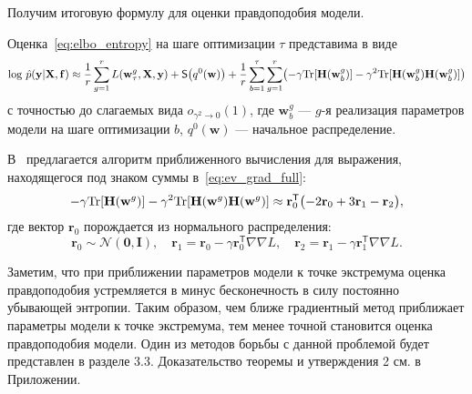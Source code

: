 \documentclass[12pt]{a&t}
\begin{document}
Получим итоговую формулу для оценки правдоподобия модели.
\begin{statement}\label{st:st2}
Оценка~\eqref{eq:elbo_entropy} на шаге оптимизации $\tau$ представима в виде
\begin{equation}
\label{eq:ev_grad_full}
\textnormal{log}~\hat{p}(\mathbf{y}|\mathbf{X}, \mathbf{f}) \approx \frac{1}{r} \sum_{g = 1}^r L(\mathbf{w}^g_\tau, \mathbf{X}, \mathbf{y})  + \mathsf{S}\big(q^0(\mathbf{w})\bigr) + \frac{1}{r}\sum_{b=1}^\tau\sum_{g=1}^r \bigl(-\gamma \textnormal{Tr}[\mathbf{H}(\mathbf{w}_b^g)] - \gamma^2 \textnormal{Tr}[\mathbf{H}(\mathbf{w}_b^g)\mathbf{H}(\mathbf{w}_b^g)]  \bigr) 
\end{equation}
с точностью до слагаемых вида $o_{\gamma^2 \to 0}(1)$,
где $\mathbf{w}_b^g$ --- $g$-я реализация параметров модели на шаге оптимизации $b$, $q^0(\mathbf{w})$ --- начальное распределение.
\end{statement}


В~\cite{early} предлагается алгоритм приближенного вычисления для выражения, находящегося под знаком суммы в~\eqref{eq:ev_grad_full}:
\[
	-\gamma \textnormal{Tr}[\mathbf{H}(\mathbf{w}^g)] - \gamma^2 \textnormal{Tr}[\mathbf{H}(\mathbf{w}^g)\mathbf{H}(\mathbf{w}^g)]  \approx \mathbf{r}_0^\mathsf{T}\bigl(-2\mathbf{r}_0 + 3\mathbf{r}_1 -\mathbf{r}_2\bigr),
\]
где вектор $\mathbf{r}_0$  порождается из нормального распределения:
$$\mathbf{r}_0 \sim \mathcal{N}(\mathbf{0}, \mathbf{I}), \quad \mathbf{r}_1 = \mathbf{r}_0 - \gamma \mathbf{r}_0^\mathsf{T} \nabla \nabla L, \quad \mathbf{r}_2 = \mathbf{r}_1 - \gamma \mathbf{r}_1^\mathsf{T} \nabla \nabla L.$$


Заметим, что при приближении параметров модели к точке экстремума оценка правдоподобия устремляется в минус бесконечность в силу постоянно убывающей энтропии. Таким образом, чем ближе градиентный метод приближает параметры модели к точке экстремума, тем менее точной становится оценка правдоподобия модели. Один из методов борьбы с данной проблемой будет представлен в разделе 3.3.
Доказательство теоремы и утверждения 2 см. в Приложении.
\end{document}
